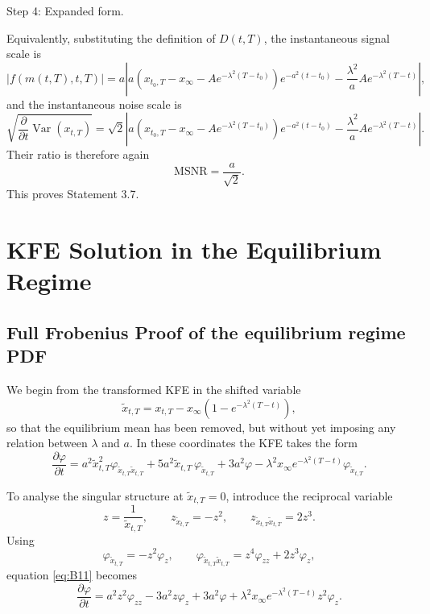 \documentclass[12pt]{article}
\theoremstyle{statementstyle}
\begin{document}
\begin{appendices}
Step 4: Expanded form.

Equivalently, substituting the definition of \(D(t,T)\), the instantaneous signal scale is
\[
|f(m(t,T),t,T)|
=
a\left|
a\left(
x_{t_0,T}
-
x_\infty
-
Ae^{-\lambda^2(T-t_0)}
\right)
e^{-a^2(t-t_0)}
-
\frac{\lambda^2}{a}Ae^{-\lambda^2(T-t)}
\right|,
\]
and the instantaneous noise scale is
\[
\sqrt{
\frac{\partial}{\partial t}\operatorname{Var}(x_{t,T})
}
=
\sqrt{2}
\left|
a\left(
x_{t_0,T}
-
x_\infty
-
Ae^{-\lambda^2(T-t_0)}
\right)
e^{-a^2(t-t_0)}
-
\frac{\lambda^2}{a}Ae^{-\lambda^2(T-t)}
\right|.
\]
Their ratio is therefore again
\[
\boxed{
\mathrm{MSNR}=\frac{a}{\sqrt{2}}.
}
\]
This proves Statement 3.7.




\section{KFE Solution in the Equilibrium Regime}
\label{appendix:B}

\subsection{Full Frobenius Proof of the equilibrium regime PDF}
\label{appendix:B1}

We begin from the transformed KFE in the shifted variable
\[
\widetilde{x}_{t,T}
=
x_{t,T}
-
x_{\infty}\!\left(1-e^{-\lambda^{2}(T-t)}\right),
\]
so that the equilibrium mean has been removed, but without yet imposing any
relation between \(\lambda\) and \(a\). In these coordinates the KFE takes the form
\begin{equation}
\frac{\partial \varphi}{\partial t}
=
a^{2}\widetilde{x}_{t,T}^{2}\varphi_{\widetilde{x}_{t,T}\widetilde{x}_{t,T}}
+
5a^{2}\widetilde{x}_{t,T}\,\varphi_{\widetilde{x}_{t,T}}
+
3a^{2}\varphi
-
\lambda^{2}x_{\infty}e^{-\lambda^{2}(T-t)}\varphi_{\widetilde{x}_{t,T}}.
\tag{B.1.1}\label{eq:B11}
\end{equation}

To analyse the singular structure at \(\widetilde{x}_{t,T}=0\), introduce the reciprocal
variable
\[
z=\frac{1}{\widetilde{x}_{t,T}},
\qquad
z_{\widetilde{x}_{t,T}}=-z^{2},
\qquad
z_{\widetilde{x}_{t,T}\widetilde{x}_{t,T}}=2z^{3}.
\]
Using
\[
\varphi_{\widetilde{x}_{t,T}}=-z^{2}\varphi_{z},
\qquad
\varphi_{\widetilde{x}_{t,T}\widetilde{x}_{t,T}}
=
z^{4}\varphi_{zz}+2z^{3}\varphi_{z},
\]
equation \eqref{eq:B11} becomes
\begin{equation}
\frac{\partial \varphi}{\partial t}
=
a^{2}z^{2}\varphi_{zz}
-
3a^{2}z\varphi_{z}
+
3a^{2}\varphi
+
\lambda^{2}x_{\infty}e^{-\lambda^{2}(T-t)}z^{2}\varphi_{z}.
\tag{B.1.2}\label{eq:B12}
\end{equation}


\end{appendices}
\end{document}
